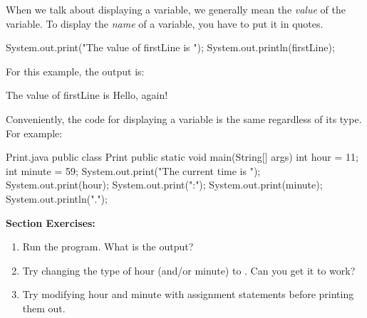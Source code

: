 %

When we talk about displaying a variable, we generally mean the {\em value} of the variable.
To display the {\em name} of a variable, you have to put it in quotes.

\begin{code}
System.out.print("The value of firstLine is ");
System.out.println(firstLine);
\end{code}

For this example, the output is:

\begin{stdout}
The value of firstLine is Hello, again!
\end{stdout}

Conveniently, the code for displaying a variable is the same regardless of its type.
For example:

\begin{trinket}[235]{Print.java}
public class Print {
    public static void main(String[] args) {
        int hour = 11;
        int minute = 59;
        System.out.print("The current time is ");
        System.out.print(hour);
        System.out.print(":");
        System.out.print(minute);
        System.out.println(".");
    }
}
\end{trinket}

%

\textbf{Section Exercises:}
\begin{enumerate}
\item Run the program.  What is the output?
\item Try changing the type of hour (and/or minute) to . Can you get it to work?
\item Try modifying hour and minute with assignment statements before printing them out.
\end{enumerate}


